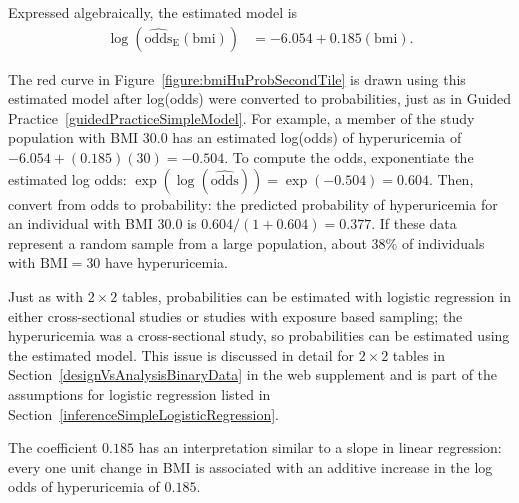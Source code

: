 Expressed algebraically, the estimated model is
\begin{align}
  \log(\widehat{\text{odds}}_\text{E}(\text{bmi})) &= -6.054 + 0.185 (\text{bmi}).
  \label{eqn:bmiHyperuricemiaModel}
\end{align}

The red curve in Figure~\ref{figure:bmiHuProbSecondTile} is drawn using this estimated model after log(odds) were converted to probabilities, just as in Guided Practice~\ref{guidedPracticeSimpleModel}. For example, a member of the study population with BMI 30.0 has an estimated log(odds) of hyperuricemia of $-6.054 + (0.185)(30) = -0.504$. To compute the odds, exponentiate the estimated log odds: $\exp(\log(\widehat{\text{odds}})) = \exp(-0.504) = 0.604$. Then, convert from odds to probability: the predicted probability of hyperuricemia for an individual with BMI 30.0 is $0.604/(1 + 0.604) = 0.377$. If these data represent a random sample from a large population, about 38\% of individuals with $\text{BMI} = 30$ have hyperuricemia.


Just as with $2 \times 2$ tables, probabilities can be estimated with logistic regression in either cross-sectional studies or studies with exposure based sampling; the hyperuricemia was a cross-sectional study, so probabilities can be estimated using the estimated model. This issue is discussed in detail for $2 \times 2$ tables in Section~\ref{designVsAnalysisBinaryData} in the web supplement and is part of the assumptions for logistic regression listed in Section~\ref{inferenceSimpleLogisticRegression}.

The coefficient $0.185$ has an interpretation similar to a slope in linear regression: every one unit change in BMI is associated with an additive increase in the log odds of hyperuricemia of $0.185$.

